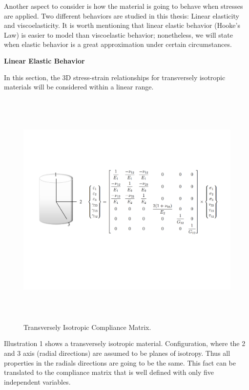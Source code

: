 \documentclass[12pt,oneside]{article}
\begin{document}
 Another aspect to consider is how the material is going to behave when stresses are applied. Two different behaviors are studied in this thesis: Linear elasticity and viscoelasticity. It is worth mentioning that linear elastic behavior (Hooke's Law) is easier to model than viscoelastic behavior; nonetheless, we will state when elastic behavior is a great approximation under certain circumstances.\par
\vspace{0.5cm}
\hspace{0.4cm} \textbf{Linear Elastic Behavior} \par 
\vspace{0.5cm}
	In this section, the 3D stress-strain relationships for transversely isotropic materials will be considered within a linear range.
	
\begin{figure}[H]
\centering	
\vspace*{-2cm}
	\includegraphics[width=17cm,height=12cm, angle=0]{transisotropicicmatrix.pdf}
\vspace*{-4cm}
\caption{Transversely Isotropic Compliance Matrix.}\label{fig:precursorfiberwithcoordsystem}
\end{figure}
Illustration 1 shows a transversely isotropic material. Configuration, where the 2 and 3 axis (radial directions) are assumed to be planes of isotropy. Thus all properties in the radials directions are going to be the same. This fact can be translated to the compliance matrix that is well defined with only five independent variables. \par
\end{document}
